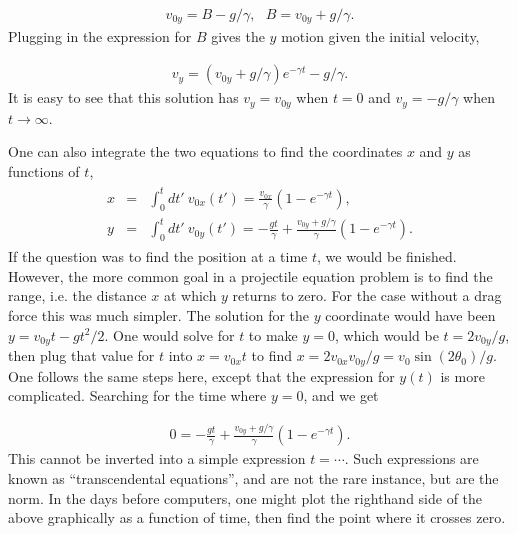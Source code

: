 \documentclass[letterpaper,10pt,english]{sphinxmanual}
\begin{document}
\begin{equation*}
\begin{split}
\begin{equation}
v_{0y}=B-g/\gamma,~~~B=v_{0y}+g/\gamma.
\label{_auto13} \tag{13}
\end{equation}
\end{split}
\end{equation*}
Plugging in the expression for \(B\) gives the \(y\) motion given the initial velocity,




\begin{equation*}
\begin{split}
\begin{equation}
v_y=(v_{0y}+g/\gamma)e^{-\gamma t}-g/\gamma.
\label{_auto14} \tag{14}
\end{equation}
\end{split}
\end{equation*}
It is easy to see that this solution has \(v_y=v_{0y}\) when \(t=0\) and
\(v_y=-g/\gamma\) when \(t\rightarrow\infty\).

One can also integrate the two equations to find the coordinates \(x\)
and \(y\) as functions of \(t\),
\begin{equation*}
\begin{split}
\begin{eqnarray}
x&=&\int_0^t dt'~v_{0x}(t')=\frac{v_{0x}}{\gamma}\left(1-e^{-\gamma t}\right),\\
\nonumber
y&=&\int_0^t dt'~v_{0y}(t')=-\frac{gt}{\gamma}+\frac{v_{0y}+g/\gamma}{\gamma}\left(1-e^{-\gamma t}\right).
\end{eqnarray}
\end{split}
\end{equation*}
If the question was to find the position at a time \(t\), we would be
finished. However, the more common goal in a projectile equation
problem is to find the range, i.e. the distance \(x\) at which \(y\)
returns to zero. For the case without a drag force this was much
simpler. The solution for the \(y\) coordinate would have been
\(y=v_{0y}t-gt^2/2\). One would solve for \(t\) to make \(y=0\), which would
be \(t=2v_{0y}/g\), then plug that value for \(t\) into \(x=v_{0x}t\) to
find \(x=2v_{0x}v_{0y}/g=v_0\sin(2\theta_0)/g\). One follows the same
steps here, except that the expression for \(y(t)\) is more
complicated. Searching for the time where \(y=0\), and we get




\begin{equation*}
\begin{split}
\begin{equation}
0=-\frac{gt}{\gamma}+\frac{v_{0y}+g/\gamma}{\gamma}\left(1-e^{-\gamma t}\right).
\label{_auto15} \tag{15}
\end{equation}
\end{split}
\end{equation*}
This cannot be inverted into a simple expression \(t=\cdots\). Such
expressions are known as “transcendental equations”, and are not the
rare instance, but are the norm. In the days before computers, one
might plot the right\sphinxhyphen{}hand side of the above graphically as
a function of time, then find the point where it crosses zero.
\end{document}
